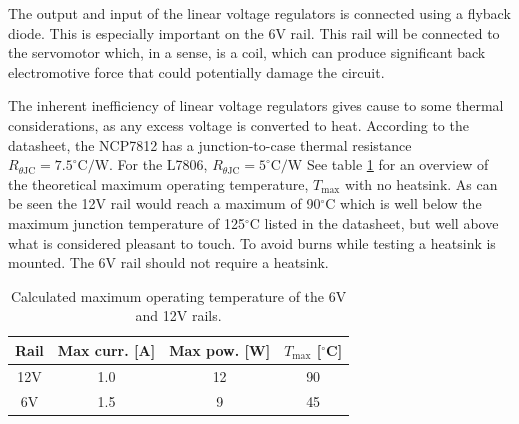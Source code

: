 The output and input of the linear voltage regulators is connected using a flyback diode. This is especially important on the 6V rail. This rail will be connected to the servomotor which, in a sense, is a coil, which can produce significant back electromotive force that could potentially damage the circuit.

The inherent inefficiency of linear voltage regulators gives cause to some thermal considerations, as any excess voltage is converted to heat. According to the datasheet, the NCP7812 has a junction-to-case thermal resistance $R_{\theta\text{JC}}=7.5^\circ\text{C/W}$. For the L7806, $R_{\theta\text{JC}}=5^\circ\text{C/W}$ See table \ref{tab:thermals} for an overview of the theoretical maximum operating temperature, $T_\text{max}$ with no heatsink. As can be seen the 12V rail would reach a maximum of 90$^\circ$C which is well below the maximum junction temperature of 125$^\circ$C listed in the datasheet, but well above what is considered pleasant to touch. To avoid burns while testing a heatsink is mounted. The 6V rail should not require a heatsink.

\begin{table}[h!]
	\centering
	\begin{tabular}{| c | c | c | c |}
		\hline
		Rail & Max curr. [A] & Max pow. [W] & $T_\text{max}$ [$^\circ$C] \\
		\hline
		12V  & 1.0 & 12 & 90 \\
		\hline
		6V   & 1.5 & 9 & 45\\
		\hline		
	\end{tabular}
	\caption[Maximum operating temperature]{Calculated maximum operating temperature of the 6V and 12V rails.}
	\label{tab:thermals}
\end{table}

